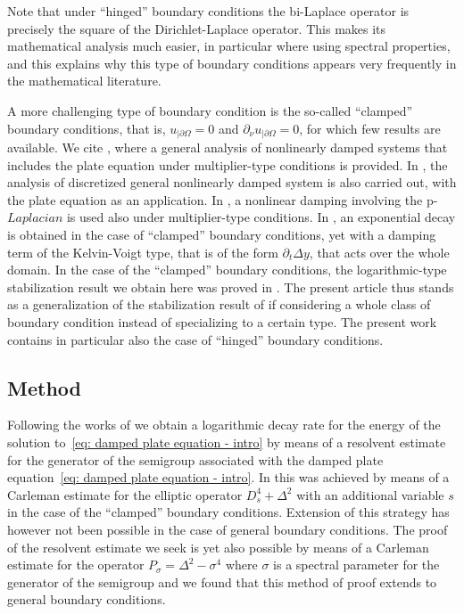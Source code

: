 \documentclass[JEP,XML,SOM,Unicode,published]{cedram}
\theoremstyle{plain}
\theoremstyle{definition}
\newcommand{\Psig}{P_{\sigma}}
\begin{document}
Note that under ``hinged'' boundary conditions the bi-Laplace operator
is precisely the square of the Dirichlet-Laplace operator. This makes
its mathematical analysis much easier, in particular where using
spectral properties, and this explains why this type of boundary
conditions appears very frequently in the mathematical literature.

A more challenging type of boundary condition is the so-called
``clamped'' boundary conditions,
that is, $u_{|\partial \Omega}=0$ and $\partial_\nu u_{|\partial \Omega}=0$,
for which few results are available. We
cite \cite{Alabau:06}, where a general analysis of nonlinearly damped
systems that includes the plate equation
under multiplier-type conditions is provided. In \cite{APT:17}, the
analysis of discretized general nonlinearly damped system is also
carried out, with the plate equation as an application. In \cite{Tebou:12}, a nonlinear
damping involving the p-$Laplacian$ is used also under multiplier-type
conditions. In \cite{DS:15}, an
exponential decay is obtained in the case of ``clamped'' boundary
conditions, yet with a damping term of the Kelvin-Voigt type, that is
of the form $\partial_t \Delta y$, that acts over the whole domain.
In the case of the ``clamped'' boundary conditions, the logarithmic-type stabilization
result we obtain here was proved in \cite{JL}. The present article
thus stands as a generalization of the stabilization result of
\cite{JL} if considering a whole class of boundary condition instead
of specializing to a certain type. The present work contains in
particular also the case of ``hinged'' boundary conditions.

\subsection{Method}
\label{sec: Method}
Following the works of \cite{JL,Lebeau:96,LR:97} we obtain a
logarithmic decay rate for the energy of the solution to~\eqref{eq:
damped plate equation - intro} by means of a resolvent estimate for
the generator of the semigroup associated with the damped plate
equation~\eqref{eq: damped plate equation - intro}. In \cite{JL} this
was achieved by means of a Carleman estimate for the elliptic operator
$D_s^4 + \Delta^2$ with an additional variable $s$ in the case of the
``clamped'' boundary conditions. Exten\-sion of this strategy has however
not been possible in the case of general boundary conditions. The proof of
the resolvent estimate we seek is yet also possible by means of a
Carleman estimate for the operator $\Psig=\Delta^2 - \sigma^4$ where
$\sigma$ is a spectral parameter for the generator of the semigroup
and we found that this method of proof extends to general boundary conditions.
\end{document}
